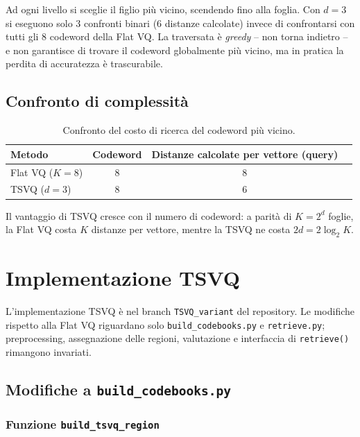 \documentclass[12pt, a4paper]{article}
\begin{document}
Ad ogni livello si sceglie il figlio più vicino, scendendo fino alla foglia. Con $d=3$ si
eseguono solo 3 confronti binari (6 distanze calcolate) invece di confrontarsi con tutti gli
8 codeword della Flat VQ. La traversata è \textit{greedy} -- non torna indietro -- e non
garantisce di trovare il codeword globalmente più vicino, ma in pratica la perdita di
accuratezza è trascurabile.

\subsection{Confronto di complessità}

\begin{table}[H]
\centering
\begin{tabular}{lccc}
\toprule
\textbf{Metodo} & \textbf{Codeword} & \textbf{Distanze calcolate per vettore (query)} \\
\midrule
Flat VQ ($K = 8$) & 8 & 8 \\
TSVQ ($d = 3$)    & 8 & 6 \\
\bottomrule
\end{tabular}
\caption{Confronto del costo di ricerca del codeword più vicino.}
\end{table}

Il vantaggio di TSVQ cresce con il numero di codeword: a parità di $K = 2^d$ foglie, la
Flat VQ costa $K$ distanze per vettore, mentre la TSVQ ne costa $2d = 2\log_2 K$.

\section{Implementazione TSVQ}
\label{sec:impl_tsvq}

L'implementazione TSVQ è nel branch \texttt{TSVQ\_variant} del repository. Le modifiche
rispetto alla Flat VQ riguardano solo \texttt{build\_codebooks.py} e \texttt{retrieve.py};
preprocessing, assegnazione delle regioni, valutazione e interfaccia di \texttt{retrieve()}
rimangono invariati.

\subsection{Modifiche a \texttt{build\_codebooks.py}}

\subsubsection{Funzione \texttt{build\_tsvq\_region}}
\end{document}
